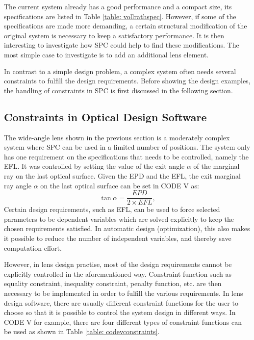 The current system already has a good performance and a compact size, its specifications are listed in Table \ref{table: vollrathspec}. However, if some of the specifications are made more demanding, a certain structural modification of the original system is necessary to keep a satisfactory performance. It is then interesting to investigate how SPC could help to find these modifications. The most simple case to investigate is to add an additional lens element. 

In contrast to a simple design problem, a complex system often needs several constraints to fulfill the design requirements. Before showing the design examples, the handling of constraints in SPC is first discussed in the following section.

\subsection{Constraints in Optical Design Software} \label{Constraints in optical design software}
The wide-angle lens shown in the previous section is a moderately complex system where SPC can be used in a limited number of positions. The system only has one requirement on the specifications that needs to be controlled, namely the EFL. It was controlled by setting the value of the exit angle $\alpha$  of the marginal ray on the last optical surface. Given the EPD and the EFL, the exit marginal ray angle $\alpha$ on the last optical surface can be set in CODE V as:
\setlength{\belowdisplayshortskip}{5pt}
\setlength{\abovedisplayshortskip}{5pt}
\begin{equation} \label{eq:EFLsolve}
\tan\alpha = \frac{EPD}{2\times EFL},
\end{equation}
\noindent Certain design requirements, such as EFL, can be used to force selected parameters to be dependent variables which are solved explicitly to keep the chosen requirements satisfied. In automatic design (optimization), this also makes it possible to reduce the number of independent variables, and thereby save computation effort.

However, in lens design practise, most of the design requirements cannot be explicitly controlled in the  aforementioned way. Constraint function such as equality constraint, inequality constraint, penalty function, etc. are then necessary to be implemented in order to fulfill the various requirements. In lens design software, there are usually different constraint functions for the user to choose so that it is possible to control the system design in different ways. In CODE V for example, there are four different types of constraint functions can be used as shown in Table \ref{table: codevconstraints}.

